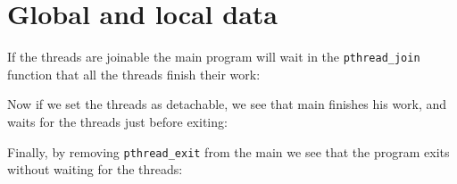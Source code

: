 \chapter{Global and local data}

If the threads are joinable the main program will wait in the \verb+pthread_join+ function that all the threads finish their work:



Now if we set the threads as detachable, we see that main finishes his work, and waits for the threads just before exiting:



Finally, by removing \verb+pthread_exit+ from the main we see that the program exits without waiting for the threads:


